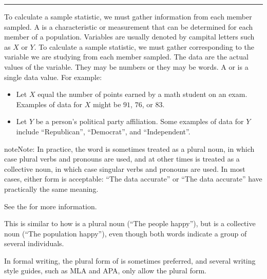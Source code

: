 \documentclass[letterpaper,10pt,english]{jupyterBook}
\begin{document}
\bigskip\hrule\bigskip


\sphinxAtStartPar
To calculate a sample statistic, we must gather information from each member sampled. A  is a characteristic or measurement that can be determined for each member of a population. Variables are usually denoted by campital letters such as \(X\) or \(Y\). To calculate a sample statistic, we must gather  corresponding to the variable we are studying from each member sampled. The data are the actual values of the variable. They may be numbers or they may be words. A  or  is a single data value. For example:
\begin{itemize}
\item {} 
\sphinxAtStartPar
Let \(X\) equal the number of points earned by a math student on an exam. Examples of data for \(X\) might be \(91\), \(76\), or \(83\).

\item {} 
\sphinxAtStartPar
Let \(Y\) be a person’s political party affiliation. Some examples of data for \(Y\) include “Republican”, “Democrat”, and “Independent”.

\end{itemize}

\begin{sphinxadmonition}{note}{Note:}
\sphinxAtStartPar
In practice, the word  is sometimes treated as a plural noun, in which case plural verbs and pronouns are used, and at other times  is treated as a collective noun, in which case singular verbs and pronouns are used. In most cases, either form is acceptable: “The data  accurate” or “The data  accurate” have practically the same meaning.%
\begin{footnote}[2]\sphinxAtStartFootnote
See the  for more information.
%
\end{footnote} This is similar to how  is a plural noun (“The people  happy”), but  is a collective noun (“The population  happy”), even though both words indicate a group of several individuals.

\sphinxAtStartPar
In formal writing, the plural form of  is sometimes preferred, and several writing style guides, such as MLA and APA, only allow the plural form.
\end{sphinxadmonition}
\end{document}
